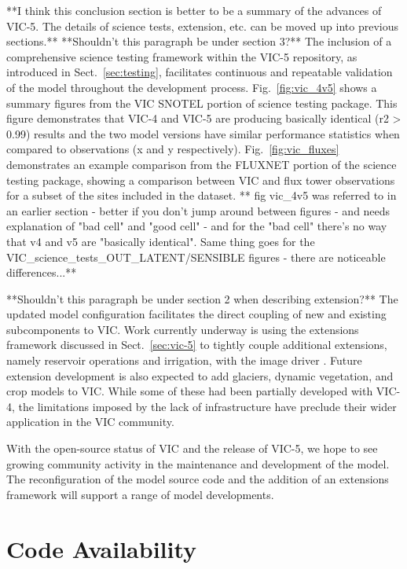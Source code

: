 \documentclass[gmd, manuscript]{copernicus}
\begin{document}
\conclusions[Conclusions]
\label{sec:conclusions}
  **I think this conclusion section is better to be a summary of the advances of VIC-5. The details of science tests, extension, etc. can be moved up into previous sections.**
  **Shouldn't this paragraph be under section 3?**
  The inclusion of a comprehensive science testing framework within the VIC-5 repository, as introduced in Sect.~\ref{sec:testing}, facilitates continuous and repeatable validation of the model throughout the development process. Fig.~\ref{fig:vic_4v5} shows a summary figures from the VIC SNOTEL portion of science testing package. This figure demonstrates that VIC-4 and VIC-5 are producing basically identical (r2 > 0.99) results and the two model versions have similar performance statistics when compared to observations (x and y respectively). Fig.~\ref{fig:vic_fluxes} demonstrates an example comparison from the FLUXNET portion of the science testing package, showing a comparison between VIC and flux tower observations for a subset of the sites included in the dataset.  ** fig vic_4v5 was referred to in an earlier section - better if you don't jump around between figures - and needs explanation of "bad cell" and "good cell" - and for the "bad cell" there's no way that v4 and v5 are "basically identical".  Same thing goes for the VIC_science_tests_OUT_LATENT/SENSIBLE figures - there are noticeable differences...**

  **Shouldn't this paragraph be under section 2 when describing extension?**
  The updated model configuration facilitates the direct coupling of new and existing subcomponents to VIC. Work currently underway is using the extensions framework discussed in Sect.~\ref{sec:vic-5} to tightly couple additional extensions, namely reservoir operations and irrigation, with the image driver \citep{Hamman_2017a}. Future extension development is also expected to add glaciers, dynamic vegetation, and crop models to VIC. While some of these had been partially developed with VIC-4, the limitations imposed by the lack of infrastructure have preclude their wider application in the VIC community.

  With the open-source status of VIC and the release of VIC-5, we hope to see growing community activity in the maintenance and development of the model. The reconfiguration of the model source code and the addition of an extensions framework will support a range of model developments.

\section{Code Availability}
\label{appendix:code_avail}
\end{document}
